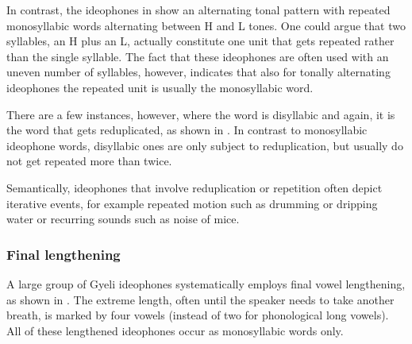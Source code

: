 In contrast, the ideophones in  show an alternating tonal pattern with repeated monosyllabic words alternating between H and L tones. One could argue that two syllables, an H plus an L, actually  constitute one unit that gets repeated rather than the single syllable. The fact that these ideophones are often used with an uneven number of syllables, however, indicates that also for tonally alternating ideophones the repeated unit is usually the monosyllabic word.



There are a few instances, however, where the word is disyllabic and again, it is the word that gets reduplicated, as shown in . In contrast to monosyllabic ideophone words, disyllabic ones are only subject to reduplication, but usually do not get repeated more than twice.




Semantically, ideophones that involve reduplication or repetition often depict iterative events, for example repeated motion such as drumming or dripping water or recurring sounds such as noise of mice.

\subsubsection*{Final lengthening}

A large group of Gyeli ideophones systematically employs final vowel lengthening, as shown in . The extreme length, often until the speaker needs to take another breath, is marked by four vowels (instead of two for phonological long vowels).  All of these lengthened ideophones occur as monosyllabic words only.


